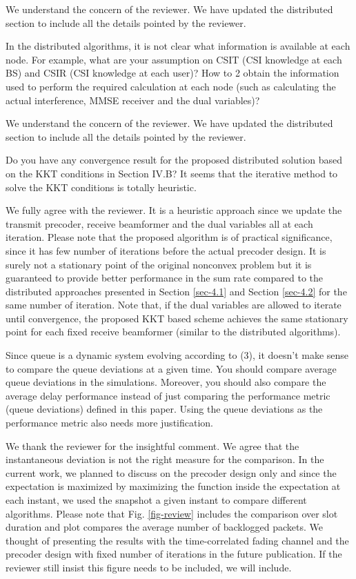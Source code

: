 \resp We understand the concern of the reviewer. We have updated the distributed section to include all the details pointed by the reviewer.

 In the distributed algorithms, it is not clear what information is available at each node. For example, what are your assumption on CSIT (CSI knowledge at each BS) and CSIR (CSI knowledge at each user)? How to 2 obtain the information used to perform the required calculation at each node (such as calculating the actual interference, MMSE receiver and the dual variables)?

\resp We understand the concern of the reviewer. We have updated the distributed section to include all the details pointed by the reviewer.

 Do you have any convergence result for the proposed distributed solution based on the KKT conditions in Section IV.B? It seems that the iterative method to solve the KKT conditions is totally heuristic.

\resp We fully agree with the reviewer. It is a heuristic approach since we update the transmit precoder, receive beamformer and the dual variables all at each iteration. Please note that the proposed algorithm is of practical significance, since it has few number of iterations before the actual precoder design. It is surely not a stationary point of the original nonconvex problem but it is guaranteed to provide better performance in the sum rate compared to the distributed approaches presented in Section \ref{sec-4.1} and Section \ref{sec-4.2} for the same number of iteration. Note that, if the dual variables are allowed to iterate until convergence, the proposed KKT based scheme achieves the same stationary point for each fixed receive beamformer (similar to the distributed algorithms).

 Since queue is a dynamic system evolving according to (3), it doesn’t make sense to compare the queue deviations at a given time. You should compare average queue deviations in the simulations. Moreover, you should also compare the average delay performance instead of just comparing the performance metric (queue deviations) defined in this paper. Using the queue deviations as the performance metric also needs more justification.

\resp We thank the reviewer for the insightful comment. We agree that the instantaneous deviation is not the right measure for the comparison. In the current work, we planned to discuss on the precoder design only and since the expectation is maximized by maximizing the function inside the expectation at each instant, we used the snapshot a given instant to compare different algorithms. Please note that Fig. \ref{fig-review} includes the comparison over  slot duration and plot compares the average number of backlogged packets. We thought of presenting the results with the time-correlated fading channel and the precoder design with fixed number of iterations in the future publication. If the reviewer still insist this figure needs to be included, we will include.

